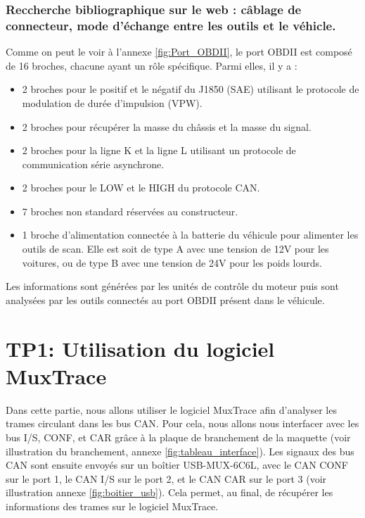 \documentclass{rapportECC}
\begin{document}
\subsubsection*{Reccherche bibliographique sur le web : câblage de connecteur, mode d'échange entre les outils et le véhicle.}

Comme on peut le voir à l'annexe \ref{fig:Port_OBDII}, le port OBDII est composé de 16 broches, chacune ayant un rôle spécifique. Parmi elles, il y a :

\begin{itemize}
    \item 2 broches pour le positif et le négatif du J1850 (SAE) utilisant le protocole de modulation de durée d'impulsion (VPW).
    \item 2 broches pour récupérer la masse du châssis et la masse du signal.
    \item 2 broches pour la ligne K et la ligne L utilisant un protocole de communication série asynchrone.
    \item 2 broches pour le LOW et le HIGH du protocole CAN.
    \item 7 broches non standard réservées au constructeur.
    \item 1 broche d'alimentation connectée à la batterie du véhicule pour alimenter les outils de scan. Elle est soit de type A avec une tension de 12V pour les voitures, ou de type B avec une tension de 24V pour les poids lourds.
\end{itemize}

Les informations sont générées par les unités de contrôle du moteur puis sont analysées par les outils connectés au port OBDII présent dans le véhicule.


\section{TP1: Utilisation du logiciel MuxTrace}

Dans cette partie, nous allons utiliser le logiciel MuxTrace afin d'analyser les trames circulant dans les bus CAN. Pour cela, nous allons nous interfacer avec les bus I/S, CONF, et CAR grâce à la plaque de branchement de la maquette (voir illustration du branchement, annexe \ref{fig:tableau_interface}). Les signaux des bus CAN sont ensuite envoyés sur un boîtier USB-MUX-6C6L, avec le CAN CONF sur le port 1, le CAN I/S sur le port 2, et le CAN CAR sur le port 3 (voir illustration annexe \ref{fig:boitier_usb}). Cela permet, au final, de récupérer les informations des trames sur le logiciel MuxTrace. \pagebreak
\end{document}
